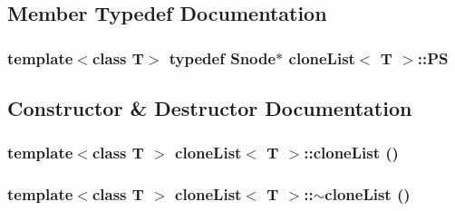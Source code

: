 \subsection{Member Typedef Documentation}
\hypertarget{classclone_list_ac029edd1aa35f72f80aa0e52d8cfd106}{
\subsubsection[{PS}]{\setlength{\rightskip}{0pt plus 5cm}template$<$class T$>$ typedef {\bf Snode}$\ast$ {\bf cloneList}$<$ T $>$::{\bf PS}}}
\label{classclone_list_ac029edd1aa35f72f80aa0e52d8cfd106}


\subsection{Constructor \& Destructor Documentation}
\hypertarget{classclone_list_a4734bf21bc044a2e277d51c6b12f605a}{
\subsubsection[{cloneList}]{\setlength{\rightskip}{0pt plus 5cm}template$<$class T $>$ {\bf cloneList}$<$ T $>$::{\bf cloneList} ()}}
\label{classclone_list_a4734bf21bc044a2e277d51c6b12f605a}
\hypertarget{classclone_list_a4b1c911fa45b3525ecbaa754fb0c6e48}{
\subsubsection[{$\sim$cloneList}]{\setlength{\rightskip}{0pt plus 5cm}template$<$class T $>$ {\bf cloneList}$<$ T $>$::$\sim${\bf cloneList} ()}}
\label{classclone_list_a4b1c911fa45b3525ecbaa754fb0c6e48}


